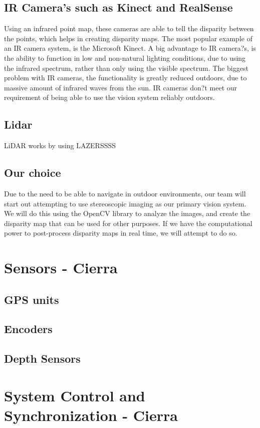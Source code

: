 \documentclass[compsoc,draftclsnofoot,onecolumn,10pt]{IEEEtran}
\begin{document}
\subsection{IR Camera's such as Kinect and RealSense}
Using an infrared point map, these cameras are able to tell the disparity between the points, which helps in creating disparity maps. The most popular example of an IR camera system, is the Microsoft Kinect. 
A big advantage to IR camera?s, is the ability to function in low and non-natural lighting conditions, due to using the infrared spectrum, rather than only using the visible spectrum. 
The biggest problem with IR cameras, the functionality is greatly reduced outdoors, due to massive amount of infrared waves from the sun. 
IR cameras don?t meet our requirement of being able to use the vision system reliably outdoors.

\subsection{Lidar}
LiDAR works by using LAZERSSSS

\subsection{Our choice}
Due to the need to be able to navigate in outdoor environments, our team will start out attempting to use stereoscopic imaging as our primary vision system. We will do this using the OpenCV library to analyze the images, and create the disparity map that can be used for other purposes. If we have the computational power to post-process disparity maps in real time, we will attempt to do so. 


\section{Sensors - Cierra}
\subsection{GPS units}
\subsection{Encoders}

\subsection{Depth Sensors}


\section{System Control and Synchronization - Cierra}
\end{document}
